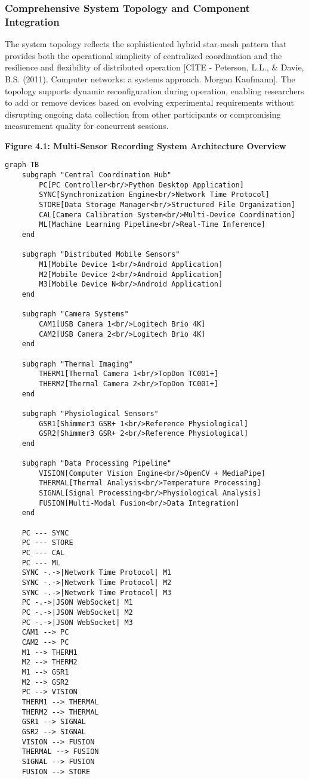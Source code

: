 \documentclass[11pt,a4paper]{report}
\begin{document}
\subsubsection{Comprehensive System Topology and Component Integration}

The system topology reflects the sophisticated hybrid star-mesh pattern that provides both the operational simplicity of
centralized coordination and the resilience and flexibility of distributed
operation [CITE - Peterson, L.L., \& Davie, B.S. (2011). Computer networks: a systems approach. Morgan Kaufmann]. The
topology supports dynamic reconfiguration during operation, enabling researchers to add or remove devices based on
evolving experimental requirements without disrupting ongoing data collection from other participants or compromising
measurement quality for concurrent sessions.

\textbf{Figure 4.1: Multi-Sensor Recording System Architecture Overview}

\begin{verbatim}
graph TB
    subgraph "Central Coordination Hub"
        PC[PC Controller<br/>Python Desktop Application]
        SYNC[Synchronization Engine<br/>Network Time Protocol]
        STORE[Data Storage Manager<br/>Structured File Organization]
        CAL[Camera Calibration System<br/>Multi-Device Coordination]
        ML[Machine Learning Pipeline<br/>Real-Time Inference]
    end

    subgraph "Distributed Mobile Sensors"
        M1[Mobile Device 1<br/>Android Application]
        M2[Mobile Device 2<br/>Android Application]
        M3[Mobile Device N<br/>Android Application]
    end

    subgraph "Camera Systems"
        CAM1[USB Camera 1<br/>Logitech Brio 4K]
        CAM2[USB Camera 2<br/>Logitech Brio 4K]
    end

    subgraph "Thermal Imaging"
        THERM1[Thermal Camera 1<br/>TopDon TC001+]
        THERM2[Thermal Camera 2<br/>TopDon TC001+]
    end

    subgraph "Physiological Sensors"
        GSR1[Shimmer3 GSR+ 1<br/>Reference Physiological]
        GSR2[Shimmer3 GSR+ 2<br/>Reference Physiological]
    end

    subgraph "Data Processing Pipeline"
        VISION[Computer Vision Engine<br/>OpenCV + MediaPipe]
        THERMAL[Thermal Analysis<br/>Temperature Processing]
        SIGNAL[Signal Processing<br/>Physiological Analysis]
        FUSION[Multi-Modal Fusion<br/>Data Integration]
    end

    PC --- SYNC
    PC --- STORE
    PC --- CAL
    PC --- ML
    SYNC -.->|Network Time Protocol| M1
    SYNC -.->|Network Time Protocol| M2
    SYNC -.->|Network Time Protocol| M3
    PC -.->|JSON WebSocket| M1
    PC -.->|JSON WebSocket| M2
    PC -.->|JSON WebSocket| M3
    CAM1 --> PC
    CAM2 --> PC
    M1 --> THERM1
    M2 --> THERM2
    M1 --> GSR1
    M2 --> GSR2
    PC --> VISION
    THERM1 --> THERMAL
    THERM2 --> THERMAL
    GSR1 --> SIGNAL
    GSR2 --> SIGNAL
    VISION --> FUSION
    THERMAL --> FUSION
    SIGNAL --> FUSION
    FUSION --> STORE
\end{verbatim}
\end{document}
